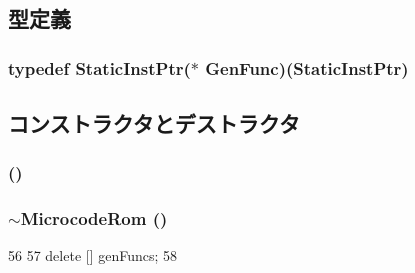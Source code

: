 \subsection{型定義}
\hypertarget{classX86ISAInst_1_1MicrocodeRom_ab8c6dcaab00ed07d03b7947fb11e91b9}{
\subsubsection[{GenFunc}]{\setlength{\rightskip}{0pt plus 5cm}typedef {\bf StaticInstPtr}($\ast$ {\bf GenFunc})({\bf StaticInstPtr})}}
\label{classX86ISAInst_1_1MicrocodeRom_ab8c6dcaab00ed07d03b7947fb11e91b9}


\subsection{コンストラクタとデストラクタ}
\hypertarget{classX86ISAInst_1_1MicrocodeRom_af15b9bcd4d23996cd669840dd56284da}{
\subsubsection[{MicrocodeRom}]{ ()}}
\label{classX86ISAInst_1_1MicrocodeRom_af15b9bcd4d23996cd669840dd56284da}
\hypertarget{classX86ISAInst_1_1MicrocodeRom_a9675155ea04f7b6554273e1eb43792b2}{
\subsubsection[{$\sim$MicrocodeRom}]{\setlength{\rightskip}{0pt plus 5cm}$\sim${\bf MicrocodeRom} ()}}
\label{classX86ISAInst_1_1MicrocodeRom_a9675155ea04f7b6554273e1eb43792b2}



\begin{DoxyCode}
56         {
57             delete [] genFuncs;
58         }
\end{DoxyCode}


